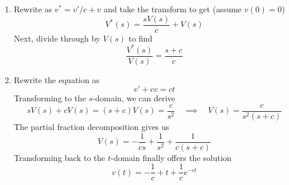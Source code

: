 \documentclass[a4paper]{article}
\begin{document}
\begin{enumerate}[label=(\alph*)]
	\item 
	Rewrite as \( v^{*} = v' / c + v \) and take the transform to get (assume \( v \!\left( 0 \right) = 0 \))
	\[
		V^{*}\!\left( s \right) = \frac{sV \!\left( s \right)}{c} + V \!\left( s \right)
	\]
	Next, divide through by \( V \!\left( s \right) \) to find
	\[
		\frac{V^{*}\!\left( s \right)}{V \!\left( s \right)} = \frac{s + c}{c} 
	\]
	\item Rewrite the equation as 
	\[
		v' + cv = ct  
	\]
	Transforming to the \( s \)-domain, we can derive
	\[
		sV \!\left( s \right) + cV \!\left( s \right) = \!\left( s + c \right)V \!\left( s \right) = \frac{c}{s^{2}} \quad \implies \quad V \!\left( s \right) = \frac{c}{s^{2}\!\left( s + c \right)}
	\]
	The partial fraction decomposition gives us
	\[
		V \!\left( s \right) = -\frac{1}{cs} + \frac{1}{s^{2}} + \frac{1}{c \!\left( s + c \right)}
	\]
	Transforming back to the \( t \)-domain finally offers the solution
	\[
		v \!\left( t \right) = -\frac{1}{c} + t + \frac{1}{c}e^{-ct} 
	\]
\end{enumerate}

\newpage
\end{document}
